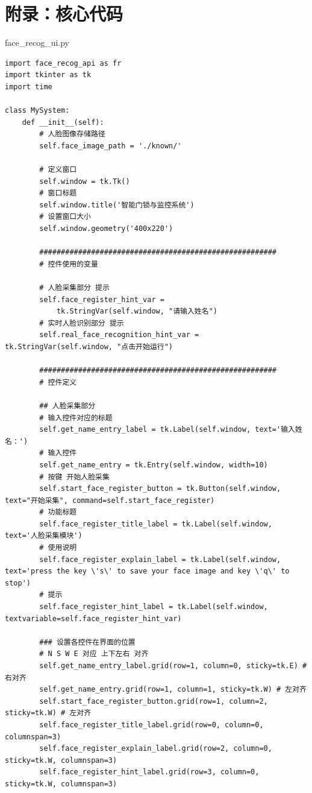 \documentclass[UTF8]{article}
\begin{document}
\section*{附录：核心代码}
\noindent face\_recog\_ui.py
\begin{lstlisting}
import face_recog_api as fr
import tkinter as tk
import time

class MySystem:
    def __init__(self):
        # 人脸图像存储路径
        self.face_image_path = './known/'

        # 定义窗口
        self.window = tk.Tk()
        # 窗口标题
        self.window.title('智能门锁与监控系统')
        # 设置窗口大小
        self.window.geometry('400x220')

        #######################################################
        # 控件使用的变量

        # 人脸采集部分 提示
        self.face_register_hint_var = 
            tk.StringVar(self.window, "请输入姓名")
        # 实时人脸识别部分 提示
        self.real_face_recognition_hint_var = tk.StringVar(self.window, "点击开始运行")

        #######################################################
        # 控件定义

        ## 人脸采集部分
        # 输入控件对应的标题
        self.get_name_entry_label = tk.Label(self.window, text='输入姓名：')
        # 输入控件
        self.get_name_entry = tk.Entry(self.window, width=10)
        # 按键 开始人脸采集
        self.start_face_register_button = tk.Button(self.window, text="开始采集", command=self.start_face_register)
        # 功能标题
        self.face_register_title_label = tk.Label(self.window, text='人脸采集模块')
        # 使用说明
        self.face_register_explain_label = tk.Label(self.window, text='press the key \'s\' to save your face image and key \'q\' to stop')
        # 提示
        self.face_register_hint_label = tk.Label(self.window, textvariable=self.face_register_hint_var)

        ### 设置各控件在界面的位置
        # N S W E 对应 上下左右 对齐
        self.get_name_entry_label.grid(row=1, column=0, sticky=tk.E) # 右对齐
        self.get_name_entry.grid(row=1, column=1, sticky=tk.W) # 左对齐
        self.start_face_register_button.grid(row=1, column=2, sticky=tk.W) # 左对齐
        self.face_register_title_label.grid(row=0, column=0, columnspan=3)
        self.face_register_explain_label.grid(row=2, column=0, sticky=tk.W, columnspan=3)
        self.face_register_hint_label.grid(row=3, column=0, sticky=tk.W, columnspan=3)


\end{lstlisting}
\end{document}
